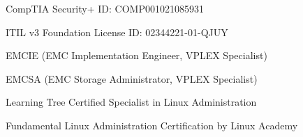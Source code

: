 
\begin{cvcerts}
  \cvcert
    {CompTIA Security+} %
    {ID: COMP001021085931} %

  \cvcert
    {ITIL v3 Foundation} %
    {License ID: 02344221-01-QJUY} %

  \cvcert
    {EMCIE (EMC Implementation Engineer, VPLEX Specialist)} %
    {} %

  \cvcert
    {EMCSA (EMC Storage Administrator, VPLEX Specialist)} %
    {} %

  \cvcert
    {Learning Tree Certified Specialist in Linux Administration} %
    {} %

  \cvcert
    {Fundamental Linux Administration Certification by Linux Academy} %
    {} %

\end{cvcerts}

